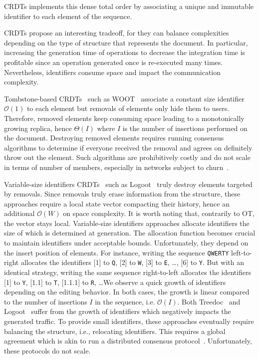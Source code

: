 CRDTs implements this dense total order by associating a unique and immutable
identifier to each element of the sequence.

\noindent CRDTs propose an interesting tradeoff, for they can balance
complexities depending on the type of structure that represents the document.
In particular, increasing the generation time of operations to decrease the
integration time is profitable since an operation generated once is re-executed
many times. Nevertheless, identifiers consume space and impact the communication
complexity.

Tombstone-based CRDTs~\cite{ahmed2011evaluating, %
  grishchenko2010deep, oster2006data, roh2011replicated, weiss2007wooki,
  wu2010partial, yu2012stringwise} such as WOOT~\cite{oster2006data} associate a
constant size identifier $\mathcal{O}(1)$ to each element but removals of
elements only hide them to users. Therefore, removed elements keep consuming
space leading to a monotonically growing replica, hence $\Theta(I)$ where $I$ is
the number of insertions performed on the document.  Destroying removed elements
requires running consensus algorithms to determine if everyone received the
removal and agrees on definitely throw out the element. Such algorithms are
prohibitively costly and do not scale in terms of number of members, especially
in networks subject to churn~\cite{mostefaoui2015signature}.

Variable-size identifiers CRDTs~\cite{nedelec2013lseq, preguica2009commutative,
  weiss2009logoot} such as Logoot~\cite{weiss2009logoot} truly destroy elements
targeted by removals.  Since removals truly erase information from the
structure, these approaches require a local state vector compacting their
history, hence an additional $\mathcal{O}(W)$ on space complexity. It is worth
noting that, contrarily to OT, the vector stays local. Variable-size identifiers
approaches allocate identifiers the size of which is determined at
generation. The allocation function becomes crucial to maintain identifiers
under acceptable bounds. Unfortunately, they depend on the insert position of
elements. For instance, writing the sequence \texttt{QWERTY} left-to-right
allocates the identifiers [1] to \texttt{Q}, [2] to \texttt{W}, [3] to
\texttt{E}, \ldots, [6] to \texttt{Y}. But with an identical strategy, writing
the same sequence right-to-left allocates the identifiers [1] to \texttt{Y},
[1.1] to \texttt{T}, [1.1.1] to \texttt{R}, \ldots We observe a quick growth of
identifiers depending on the editing behavior. In both cases, the growth is
linear compared to the number of insertions $I$ in the sequence,
i.e. $\mathcal{O}(I)$. Both Treedoc~\cite{preguica2009commutative} and
Logoot~\cite{weiss2009logoot, weiss2010logootundo} suffer from the growth of
identifiers which negatively impacts the generated traffic.
To provide small identifiers, these approaches eventually require balancing the
structure, i.e., relocating identifiers. This requires a global agreement which is
akin to run a distributed consensus
protocol~\cite{zawirski2011asynchronous}. Unfortunately, these protocols do not
scale.

